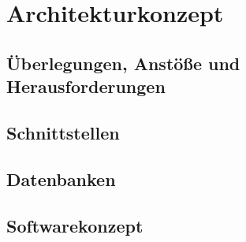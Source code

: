 \section{Architekturkonzept}
\label{sec:architekturkonzept}


    \subsection{Überlegungen, Anstöße und Herausforderungen}



    
    \subsection{Schnittstellen}
    
    \subsection{Datenbanken}

\subsection{Softwarekonzept}
\label{subsec:softwarekonzept}



